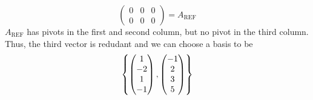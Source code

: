 \begin{example}{}{}
\begin{solution}
\[\begin{pmatrix}
                0 & 0 & 0 \\
                0 & 0 & 0
            \end{pmatrix}
            = A_{\text{REF}}
        \]
        $A_{\text{REF}}$ has pivots in the first and second column, but no pivot in the third column. Thus, the third vector is redudant and we can choose a basis to be 
        \[
            \left\{
                \begin{pmatrix}
                    1 \\ -2 \\ 1 \\ -1
                \end{pmatrix},
                \begin{pmatrix}
                    -1 \\ 2 \\ 3 \\ 5
                \end{pmatrix}
             \right\}
        \]
    \end{solution}
\end{example}

